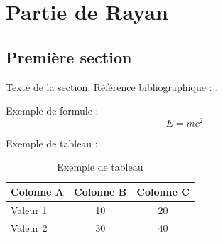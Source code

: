 \chapter{Partie de Rayan}
\label{chap:partie-rayan}

\section{Première section}
Texte de la section. Référence bibliographique : \cite{exemple}.

Exemple de formule :
\begin{equation}
    E = mc^2
    \label{eq:einstein}
\end{equation}

Exemple de tableau :
\begin{table}[H]
    \centering
    \begin{tabular}{lcc}
        \toprule
        Colonne A & Colonne B & Colonne C \\
        \midrule
        Valeur 1  & 10        & 20 \\
        Valeur 2  & 30        & 40 \\
        \bottomrule
    \end{tabular}
    \caption{Exemple de tableau}
    \label{tab:exemple}
\end{table}

